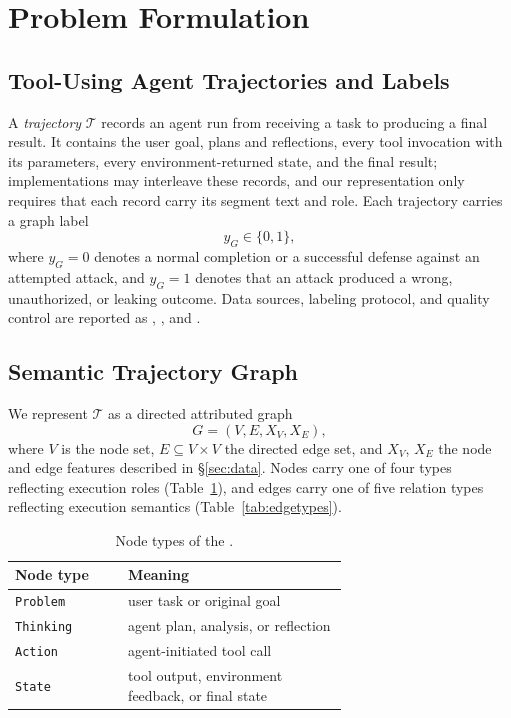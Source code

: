\section{Problem Formulation}
\label{sec:problem}

\subsection{Tool-Using Agent Trajectories and Labels}
A \emph{trajectory} $\mathcal{T}$ records an agent run from receiving a task to producing a final result. It contains the user goal, plans and reflections, every tool invocation with its parameters, every environment-returned state, and the final result; implementations may interleave these records, and our representation only requires that each record carry its segment text and role. Each trajectory carries a graph label
\begin{equation}
y_G \in \{0,1\},
\label{eq:label}
\end{equation}
where $y_G=0$ denotes a normal completion or a successful defense against an attempted attack, and $y_G=1$ denotes that an attack produced a wrong, unauthorized, or leaking outcome. Data sources, labeling protocol, and quality control are reported as , , and .

\subsection{Semantic Trajectory Graph}
We represent $\mathcal{T}$ as a directed attributed graph
\begin{equation}
G=(V,E,X_V,X_E),
\label{eq:graph}
\end{equation}
where $V$ is the node set, $E\subseteq V\times V$ the directed edge set, and $X_V$, $X_E$ the node and edge features described in \S\ref{sec:data}. Nodes carry one of four types reflecting execution roles (Table~\ref{tab:nodetypes}), and edges carry one of five relation types reflecting execution semantics (Table~\ref{tab:edgetypes}).

\begin{table}[t]
\caption{Node types of the \stg{}.}
\label{tab:nodetypes}
\begin{tabular}{@{}lp{0.66\linewidth}@{}}
\toprule
Node type & Meaning \\
\midrule
\texttt{Problem} & user task or original goal \\
\texttt{Thinking} & agent plan, analysis, or reflection \\
\texttt{Action} & agent-initiated tool call \\
\texttt{State} & tool output, environment feedback, or final state \\
\bottomrule
\end{tabular}
\end{table}

